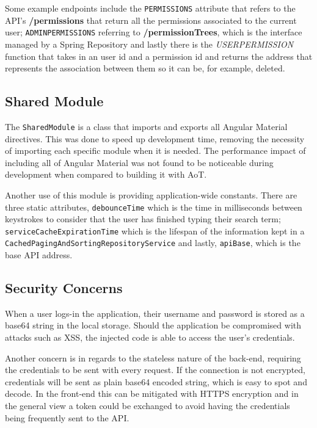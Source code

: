 Some example endpoints include the \texttt{PERMISSIONS} attribute that refers to the \gls{API}'s \textbf{/permissions} that return all the permissions associated to the current user; \texttt{ADMIN\textunderscore PERMISSIONS} referring to \textbf{/permissionTrees}, which is the interface managed by a Spring Repository and lastly there is the \textit{USER\textunderscore PERMISSION} function that takes in an user id and a permission id and returns the address that represents the association between them so it can be, for example, deleted.

\subsection{Shared Module}\label{shared}
The \texttt{SharedModule} is a class that imports and exports all Angular Material directives. This was done to speed up development time, removing the necessity of importing each specific module when it is needed. The performance impact of including all of Angular Material was not found to be noticeable during development when compared to building it with \gls{AoT}.

Another use of this module is providing application-wide constants. There are three static attributes, \texttt{debounceTime} which is the time in milliseconds between keystrokes to consider that the user has finished typing their search term; \texttt{serviceCacheExpirationTime} which is the lifespan of the information kept in a \texttt{CachedPagingAndSortingRepositoryService} and lastly, \texttt{apiBase}, which is the base \gls{API} address.

\subsection{Security Concerns}\label{concerns}
When a user logs-in the application, their username and password is stored as a base64 string in the local storage. Should the application be compromised with attacks such as \gls{XSS}, the injected code is able to access the user's credentials.

Another concern is in regards to the stateless nature of the back-end, requiring the credentials to be sent with every request. If the connection is not encrypted, credentials will be sent as plain base64 encoded string, which is easy to spot and decode. In the front-end this can be mitigated with \gls{HTTPS} encryption and in the general view a token could be exchanged to avoid having the credentials being frequently sent to the \gls{API}.



